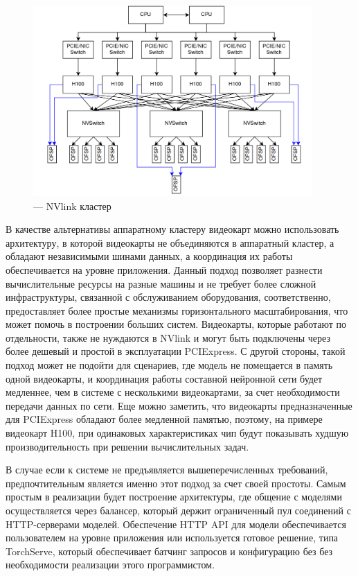 \begin{figure}[H]
  \centering
  \includegraphics[width=0.95\textwidth]{img/nvlink.png}
  \caption{--- NVlink кластер}
    \label{fig:nvlink}
\end{figure}


В качестве альтернативы аппаратному кластеру видеокарт можно использовать архитектуру, в которой видеокарты не объединяются
в аппаратный кластер, а обладают независимыми шинами данных, а координация их работы обеспечивается на уровне приложения.
Данный подход позволяет разнести вычислительные ресурсы на разные машины и не требует более сложной инфраструктуры, связанной
с обслуживанием оборудования, соответственно, предоставляет более простые механизмы горизонтального масштабирования,
что может помочь в построении больших систем. Видеокарты, которые работают по отдельности, также не нуждаются в 
NVlink и могут быть подключены через более дешевый и простой в эксплуатации PCIExpress.
С другой стороны, такой подход может не подойти для сценариев, где модель не помещается в память одной видеокарты, и координация
работы составной нейронной сети будет медленнее, чем в системе с несколькими видеокартами, за счет необходимости
передачи данных по сети. Еще можно заметить, что видеокарты предназначенные для PCIExpress обладают более медленной
памятью, поэтому, на примере видеокарт H100, при одинаковых характеристиках чип будут показывать худшую производительность
при решении вычислительных задач.

В случае если к системе не предъявляется вышеперечисленных требований, предпочтительным является именно этот подход за счет своей простоты.
Самым простым в реализации будет построение архитектуры, где общение с моделями осуществляется через балансер, который
держит ограниченный пул соединений с HTTP-серверами моделей. Обеспечение HTTP API для модели обеспечивается пользователем
на уровне приложения или используется готовое решение, типа TorchServe, который обеспечивает батчинг запросов и конфигурацию без
без необходимости реализации этого программистом.

